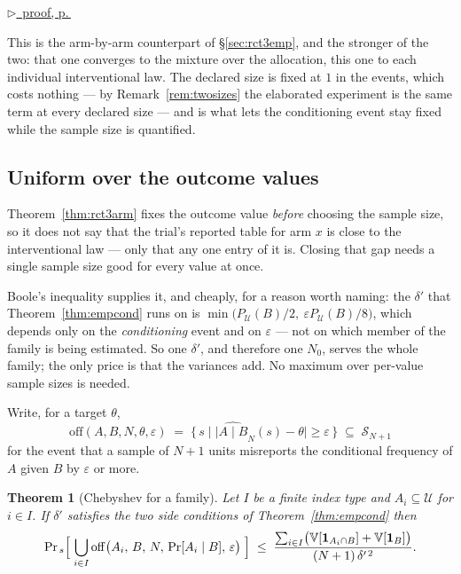 \documentclass[11pt,a4paper]{article}
\theoremstyle{definition}
\theoremstyle{plain}
\newtheorem{theorem}[definition]{Theorem}
\theoremstyle{remark}
\newcommand{\Ctx}{\mathcal{U}}         %
\newcommand{\Smp}{\mathcal{S}}         %
\newcommand{\emp}[1]{\widehat{#1}}
\newcommand{\Ind}[1]{\mathbf{1}_{#1}}
\newcommand{\Var}{\mathbb{V}}
\renewcommand{\Pr}{\mathrm{Pr}}
\newcommand{\pfref}[1]{%
  \par\smallskip\noindent
  \hyperref[pf:#1]{\small$\triangleright$\ proof, p.\,\pageref{pf:#1}}\par\smallskip}
\begin{document}
\pfref{thm:rct3arm}

This is the arm-by-arm counterpart of \S\ref{sec:rct3emp}, and the stronger
of the two: that one converges to the mixture over the allocation, this one
to each individual interventional law. The declared size is fixed at $1$ in
the events, which costs nothing --- by Remark~\ref{rem:twosizes} the
elaborated experiment is the same term at every declared size --- and is
what lets the conditioning event stay fixed while the sample size is
quantified.

\subsection{Uniform over the outcome values}
\label{sec:unifcond}

Theorem~\ref{thm:rct3arm} fixes the outcome value \emph{before} choosing
the sample size, so it does not say that the trial's reported table for
arm $x$ is close to the interventional law --- only that any one entry of
it is. Closing that gap needs a single sample size good for every value at
once.

Boole's inequality supplies it, and cheaply, for a reason worth naming:
the $\delta'$ that Theorem~\ref{thm:empcond} runs on is
$\min\bigl(P_\Ctx(B)/2,\ \varepsilon P_\Ctx(B)/8\bigr)$, which depends
only on the \emph{conditioning} event and on $\varepsilon$ --- not on
which member of the family is being estimated. So one $\delta'$, and
therefore one $N_0$, serves the whole family; the only price is that the
variances add. No maximum over per-value sample sizes is needed.

Write, for a target $\theta$,
\[
  \mathrm{off}(A,B,N,\theta,\varepsilon)
  \;=\;
  \bigl\{\, s \;\big|\;
    \bigl|\emp{A \mid B}_N(s) - \theta\bigr| \ge \varepsilon \,\bigr\}
  \;\subseteq\; \Smp_{N+1}
\]
for the event that a sample of $N+1$ units misreports the conditional
frequency of $A$ given $B$ by $\varepsilon$ or more.

\begin{theorem}[Chebyshev for a family]
\label{thm:empcondfam}
Let $I$ be a finite index type and $A_i \subseteq \Ctx$ for $i \in I$. If
$\delta'$ satisfies the two side conditions of Theorem~\ref{thm:empcond}
then
\[
  \Pr_{\,s}\Bigl[\;\bigcup_{i \in I}
    \mathrm{off}\bigl(A_i,\,B,\,N,\,\Pr[A_i \mid B],\,\varepsilon\bigr)
  \;\Bigr]
  \;\le\;
  \frac{\sum_{i \in I}
        \bigl(\Var[\Ind{A_i \cap B}] + \Var[\Ind{B}]\bigr)}
       {(N+1)\,\delta'^{\,2}} .
\]
\end{theorem}
\end{document}
